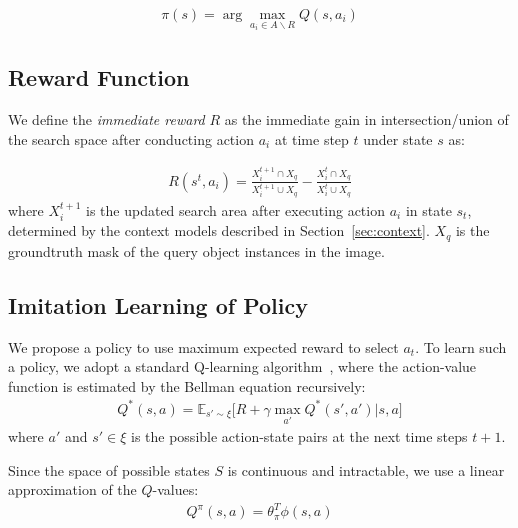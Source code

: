 \begin{eqnarray}
\label{eq:pi}
\pi(s) = \arg\max_{a_i\in A\backslash R} Q(s,a_i)
\end{eqnarray}

\subsection{Reward Function}

We define the \textit{immediate reward} $R$ as the immediate gain in intersection/union of the search space after conducting action $a_i$ at time step $t$ under state $s$ as:

\begin{eqnarray}
\label{eq:imreward}
R(s^t,a_i) =  \frac{X^{t+1}_i \cap X_q}{X^{t+1}_i \cup X_q} - \frac{X^{t}_i \cap X_q}{X^{t}_i \cup X_q}
\end{eqnarray}
where $X^{t+1}_i$ is the updated search area after executing action $a_i$ in state $s_t$, determined by the context models described in Section~\ref{sec:context}. $X_q$ is the groundtruth mask of the query object instances in the image. 
  




\subsection{Imitation Learning of Policy}
We propose a policy to use maximum expected reward to select $a_t$. To learn such a policy, we adopt a standard Q-learning algorithm~\cite{barto1998reinforcement}, where the action-value function is estimated by the Bellman equation recursively:
\begin{eqnarray}
\label{eq:bellman}
Q^*(s,a) = \mathbb{E}_{s'\sim \xi} \big[ R + \gamma \max_{a'} Q^*(s',a')|s,a \big]
\end{eqnarray}
where $a'$ and $s'\in\xi$ is the possible action-state pairs at the next time steps $t+1$.

Since the space of possible states $S$ is continuous and intractable, we use a linear approximation of the $Q$-values:
\begin{eqnarray}
\label{eq:qvalue}
Q^{\pi}(s,a) = \theta_\pi^T \phi(s,a) 
\end{eqnarray}

